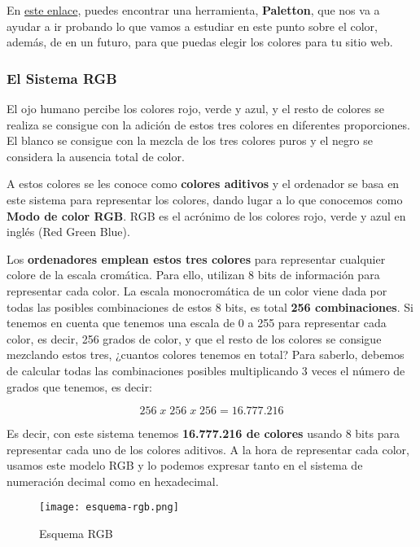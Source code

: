 En \href{https://paletton.com/#uid=1000u0kllllaFw0g0qFqFg0w0aF}{este enlace}, puedes encontrar una herramienta, \textbf{Paletton}, que nos va a ayudar a ir probando lo que vamos a estudiar en este punto sobre el color, además, de en un futuro, para que puedas elegir los colores para tu sitio web.

\subsubsection{El Sistema RGB}
El ojo humano percibe los colores rojo, verde y azul, y el resto de colores se realiza se consigue con la adición de estos tres colores en diferentes proporciones. El blanco se consigue con la mezcla de los tres colores puros y el negro se considera la ausencia total de color.

A estos colores se les conoce como \textbf{colores aditivos} y el ordenador se basa en este sistema para representar los colores, dando lugar a lo que conocemos como \textbf{Modo de color RGB}. RGB es el acrónimo de los colores rojo, verde y azul en inglés (Red Green Blue).

Los \textbf{ordenadores emplean estos tres colores} para representar cualquier colore de la escala cromática. Para ello, utilizan 8 bits de información para representar cada color. La escala monocromática de un color viene dada por todas las posibles combinaciones de estos 8 bits, es total\textbf{ 256 combinaciones}. Si tenemos en cuenta que tenemos una escala de 0 a 255 para representar cada color, es decir, 256 grados de color, y que el resto de los colores se consigue mezclando estos tres, ¿cuantos colores tenemos en total? Para saberlo, debemos de calcular todas las combinaciones posibles multiplicando 3 veces el número de grados que tenemos, es decir:

\begin{equation*}
    256\;x\;256\;x\;256 = 16.777.216
\end{equation*}


Es decir, con este sistema tenemos \textbf{16.777.216 de colores} usando 8 bits para representar cada uno de los colores aditivos. A la hora de representar cada color, usamos este modelo RGB y lo podemos expresar tanto en el sistema de numeración decimal como en hexadecimal.

\begin{figure}[H]
    \centering
    \texttt{[image: esquema-rgb.png]}
    \caption{Esquema RGB}
\end{figure}

